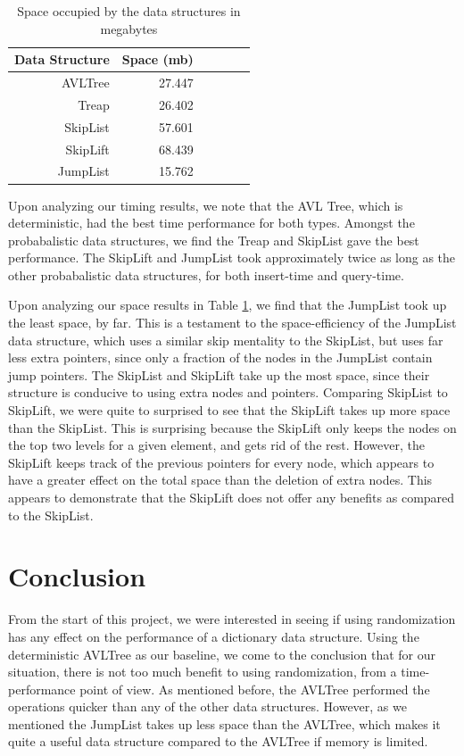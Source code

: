 \documentclass[oribibl]{llncs}
\begin{document}
\begin{table}[htbp]
\caption{Space occupied by the data structures in megabytes}
\begin{center}
\begin{tabular}{|r|r|r|r|r|r|}
\hline
Data Structure & Space (mb) \\ \hline
AVLTree & 27.447 \\ \hline
Treap & 26.402 \\ \hline
SkipList & 57.601  \\ \hline
SkipLift & 68.439 \\ \hline
JumpList & 15.762 \\ \hline
\end{tabular}
\end{center}
\label{table:space}
\end{table}

Upon analyzing our timing results, we note that the AVL Tree, which is deterministic, had the best time performance for both types. Amongst the probabalistic data structures, we find the Treap and SkipList gave the best performance. The SkipLift and JumpList took approximately twice as long as the other probabalistic data structures, for both insert-time and query-time.

Upon analyzing our space results in Table \ref{table:space}, we find that the JumpList took up the least space, by far. This is a testament to the space-efficiency of the JumpList data structure, which uses a similar skip mentality to the SkipList, but uses far less extra pointers, since only a fraction of the nodes in the JumpList contain jump pointers. The SkipList and SkipLift take up the most space, since their structure is conducive to using extra nodes and pointers. Comparing SkipList to SkipLift, we were quite to surprised to see that the SkipLift takes up more space than the SkipList. This is surprising because the SkipLift only keeps the nodes on the top two levels for a given element, and gets rid of the rest. However, the SkipLift keeps track of the previous pointers for every node, which appears to have a greater effect on the total space than the deletion of extra nodes. This appears to demonstrate that the SkipLift does not offer any benefits as compared to the SkipList.

\section{Conclusion}
\label{sctn:Conclusion}

From the start of this project, we were interested in seeing if using randomization has any effect on the performance of a dictionary data structure. Using the deterministic AVLTree as our baseline, we come to the conclusion that for our situation, there is not too much benefit to using randomization, from a time-performance point of view. As mentioned before, the AVLTree performed the operations quicker than any of the other data structures. However, as we mentioned the JumpList takes up less space than the AVLTree, which makes it quite a useful data structure compared to the AVLTree if memory is limited.
\end{document}
